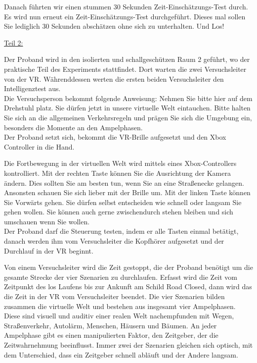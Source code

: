 \documentclass{Bericht}
\begin{document}
Danach führten wir einen stummen 30 Sekunden Zeit-Einschätzungs-Test durch.  \glqq Es wird nun erneut ein Zeit-Einschätzungs-Test durchgeführt. Dieses mal sollen Sie lediglich 30 Sekunden abschätzen ohne sich zu unterhalten. Und Los!\grqq{}

\underline{Teil 2:} 

Der Proband wird in den isolierten und schallgeschützen \glqq Raum 2\grqq{} geführt, wo der praktische Teil des Experiments stattfindet. Dort warten die zwei Versuchsleiter von der VR. Währenddessen werten die ersten beiden Versuchsleiter den Intelligenztest aus.  \\

Die Versuchsperson bekommt folgende Anweisung: \glqq Nehmen Sie bitte hier auf dem Drehstuhl platz. Sie dürfen jetzt in unsere virtuelle Welt eintauchen. Bitte halten Sie sich an die allgemeinen Verkehrsregeln und prägen Sie sich die Umgebung ein, besonders die Momente an den Ampelphasen.\grqq{} \\

Der Proband setzt sich, bekommt die VR-Brille aufgesetzt und den Xbox Controller in die Hand.

\glqq Die Fortbewegung in der virtuellen Welt wird mittels eines Xbox-Controllers kontrolliert. Mit der rechten Taste können Sie die Ausrichtung der Kamera ändern. Dies sollten Sie am besten tun, wenn Sie an eine Straßenecke gelangen. Ansonsten schauen Sie sich lieber mit der Brille um. Mit der linken Taste können Sie Vorwärts gehen. Sie dürfen selbst entscheiden wie schnell oder langsam Sie gehen wollen. Sie können auch gerne zwischendurch stehen bleiben und sich umschauen wenn Sie wollen.\grqq{} \\ Der Proband darf die Steuerung testen, indem er alle Tasten einmal betätigt, danach werden ihm vom Versuchsleiter die Kopfhörer aufgesetzt und der Durchlauf in der VR beginnt. 

Von einem Versuchsleiter wird die Zeit gestoppt, die der Proband benötigt um die gesamte Strecke der vier Szenarien zu durchlaufen. Erfasst wird die Zeit vom Zeitpunkt des los Laufens bis zur Ankunft am Schild \glqq Road Closed\grqq{}, dann wird das die Zeit in der VR vom Versuchsleiter beendet. Die vier Szenarien bilden zusammen die virtuelle Welt und bestehen aus insgesamt vier Ampelphasen. Diese sind visuell und auditiv einer realen Welt nachempfunden mit Wegen, Straßenverkehr, Autolärm, Menschen, Häusern und Bäumen. An jeder Ampelphase gibt es einen manipulierten Faktor, den Zeitgeber, der die Zeitwahrnehmung beeinflusst. Immer zwei der Szenarien gleichen sich optisch, mit dem Unterschied, dass ein Zeitgeber schnell abläuft und der Andere langsam. \\
\end{document}
